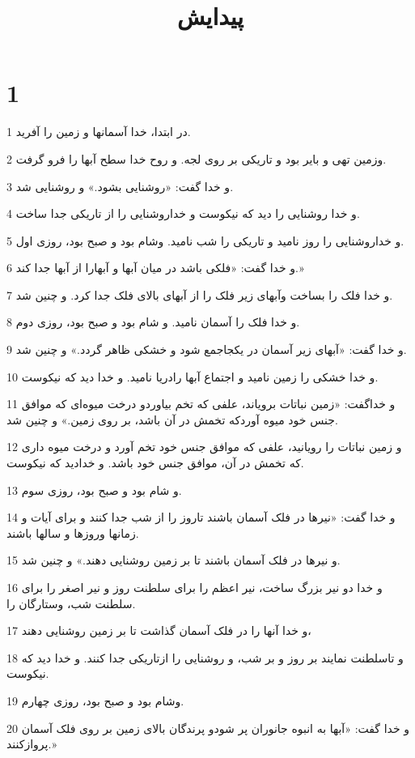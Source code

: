 

\title{پيدايش}

 
\chapter{1}

\par 1 در ابتدا، خدا آسمانها و زمین را آفرید.
\par 2 وزمین تهی و بایر بود و تاریکی بر روی لجه. و روح خدا سطح آبها را فرو گرفت.
\par 3 و خدا گفت: «روشنایی بشود.» و روشنایی شد.
\par 4 و خدا روشنایی را دید که نیکوست و خداروشنایی را از تاریکی جدا ساخت.
\par 5 و خداروشنایی را روز نامید و تاریکی را شب نامید. وشام بود و صبح بود، روزی اول.
\par 6 و خدا گفت: «فلکی باشد در میان آبها و آبهارا از آبها جدا کند.»
\par 7 و خدا فلک را بساخت وآبهای زیر فلک را از آبهای بالای فلک جدا کرد. و چنین شد.
\par 8 و خدا فلک را آسمان نامید. و شام بود و صبح بود، روزی دوم.
\par 9 و خدا گفت: «آبهای زیر آسمان در یکجاجمع شود و خشکی ظاهر گردد.» و چنین شد.
\par 10 و خدا خشکی را زمین نامید و اجتماع آبها رادریا نامید. و خدا دید که نیکوست.
\par 11 و خداگفت: «زمین نباتات برویاند، علفی که تخم بیاوردو درخت میوه‌ای که موافق جنس خود میوه آوردکه تخمش در آن باشد، بر روی زمین.» و چنین شد.
\par 12 و زمین نباتات را رویانید، علفی که موافق جنس خود تخم آورد و درخت میوه داری که تخمش در آن، موافق جنس خود باشد. و خدادید که نیکوست.
\par 13 و شام بود و صبح بود، روزی سوم.
\par 14 و خدا گفت: «نیرها در فلک آسمان باشند تاروز را از شب جدا کنند و برای آیات و زمانها وروزها و سالها باشند.
\par 15 و نیرها در فلک آسمان باشند تا بر زمین روشنایی دهند.» و چنین شد.
\par 16 و خدا دو نیر بزرگ ساخت، نیر اعظم را برای سلطنت روز و نیر اصغر را برای سلطنت شب، وستارگان را.
\par 17 و خدا آنها را در فلک آسمان گذاشت تا بر زمین روشنایی دهند،
\par 18 و تاسلطنت نمایند بر روز و بر شب، و روشنایی را ازتاریکی جدا کنند. و خدا دید که نیکوست.
\par 19 وشام بود و صبح بود، روزی چهارم.
\par 20 و خدا گفت: «آبها به انبوه جانوران پر شودو پرندگان بالای زمین بر روی فلک آسمان پروازکنند.»
